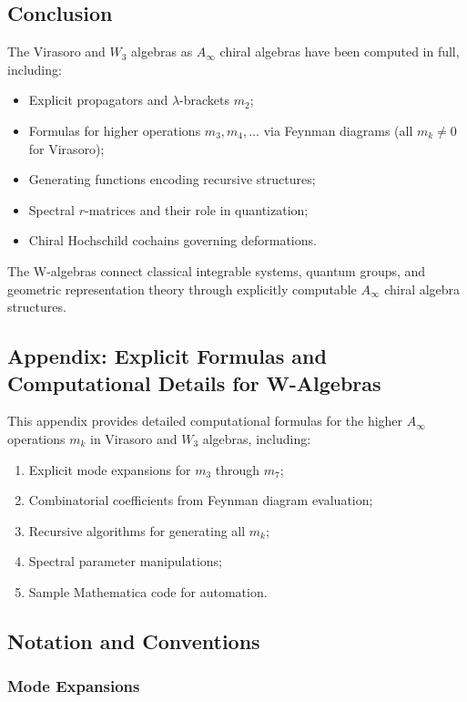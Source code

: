 \subsection{Conclusion}

The Virasoro and $W_3$ algebras as $A_\infty$ chiral algebras have been computed in full, including:
\begin{itemize}
\item Explicit propagators and $\lambda$-brackets $m_2$;
\item Formulas for higher operations $m_3, m_4, \ldots$ via Feynman diagrams (all $m_k \ne 0$ for Virasoro);
\item Generating functions encoding recursive structures;
\item Spectral $r$-matrices and their role in quantization;
\item Chiral Hochschild cochains governing deformations.
\end{itemize}

The W-algebras connect classical integrable systems, quantum groups, and geometric representation theory through explicitly computable $A_\infty$ chiral algebra structures.



\subsection*{Appendix: Explicit Formulas and Computational Details for W-Algebras}

This appendix provides detailed computational formulas for the higher $A_\infty$ operations $m_k$ in Virasoro and $W_3$ algebras, including:
\begin{enumerate}
\item Explicit mode expansions for $m_3$ through $m_7$;
\item Combinatorial coefficients from Feynman diagram evaluation;
\item Recursive algorithms for generating all $m_k$;
\item Spectral parameter manipulations;
\item Sample Mathematica code for automation.
\end{enumerate}

\subsection{Notation and Conventions}

\subsubsection{Mode Expansions}

